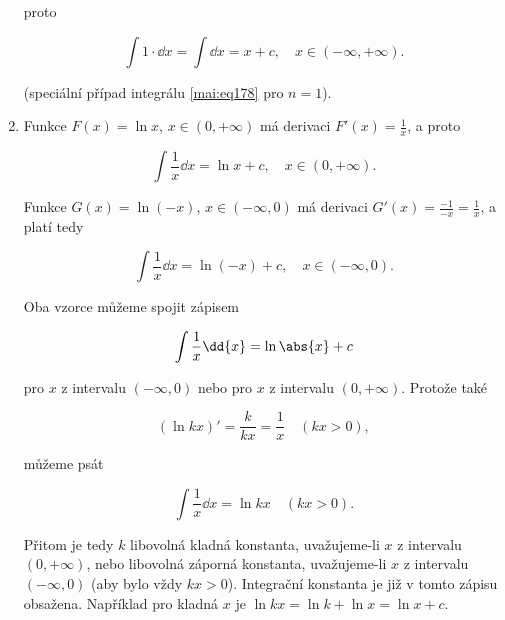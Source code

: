\begin{enumerate}
            proto
            \begin{fleqn}[\parindent]
              \begin{equation*}
                \int 1\cdot\dd{x} = \int\dd{x} = x + c, \quad x\in(-\infty,+\infty).
              \end{equation*}
            \end{fleqn}
            (speciální případ integrálu \ref{mai:eq178} pro \(n=1\)).
      \item Funkce \(F(x)=\ln x\), \(x\in(0,+\infty)\) má derivaci \(F'(x) = \frac{1}{x}\), a proto
            \begin{fleqn}[\parindent]  
              \begin{equation*}
                \int\frac{1}{x}\dd{x} = \ln x + c, \quad x\in(0,+\infty).
              \end{equation*} 
            \end{fleqn}
            Funkce \(G(x) = \ln(-x)\), \(x\in(-\infty,0)\) má derivaci \(G'(x) = \frac{-1}{-x} =
            \frac{1}{x}\), a platí tedy
            \begin{fleqn}[\parindent]
              \begin{equation*}
                \int\frac{1}{x}\dd{x} = \ln(-x) + c, \quad x\in(-\infty,0).
              \end{equation*}
            \end{fleqn}
            Oba vzorce můžeme spojit zápisem
            \begin{fleqn}[\parindent]
              \begin{equation*}
                \int\frac{1}{x}\dd{x} = \ln\abs{x} + c
              \end{equation*}
            \end{fleqn}
            pro \(x\) z intervalu \((-\infty,0)\) nebo pro \(x\) z intervalu \((0,+\infty)\).
            Protože také
            \begin{fleqn}[\parindent]
              \begin{equation*}
                (\ln kx)' = \frac{k}{kx} = \frac{1}{x} \quad (kx>0),
              \end{equation*}
            \end{fleqn}  
            můžeme psát
            \begin{fleqn}[\parindent]
              \begin{equation*}
                \int\frac{1}{x}\dd{x} = \ln kx \quad (kx>0).
              \end{equation*}
            \end{fleqn}  
            Přitom je tedy \(k\) libovolná kladná konstanta, uvažujeme-li \(x\) z intervalu
            \((0,+\infty)\), nebo libovolná záporná konstanta, uvažujeme-li \(x\) z intervalu
            \((-\infty,0)\) (aby bylo vždy \(kx>0\)). Integrační konstanta je již v tomto zápisu
            obsažena. Například pro kladná \(x\) je \(\ln kx = \ln k + \ln x = \ln x + c\).
            

\end{enumerate}
